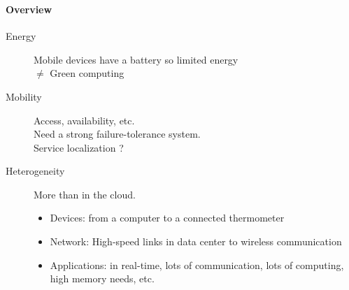 \documentclass[utf8,xcolor=table, page number]{earlywinter}
\begin{document}

\begin{frame}
  \frametitle{\subsecname}
  \framesubtitle{Overview}
  \begin{description}
    \item[{\color{orange!95!black}Energy}] Mobile devices have a battery so limited energy\\
      $\neq$ Green computing
    \item[{\color{orange!95!black}Mobility}] Access, availability, etc.\\
      Need a strong failure-tolerance system.\\
      Service localization ?
    \item[{\color{orange!95!black}Heterogeneity}] More than in the cloud.\\
      \begin{itemize}
        \item Devices: from a computer to a connected thermometer\\
        \item Network: High-speed links in data center to wireless communication
        \item Applications: in real-time, lots of communication, lots of computing,
      high memory needs, etc.
      \end{itemize}
  \end{description}
\end{frame}
\end{document}
